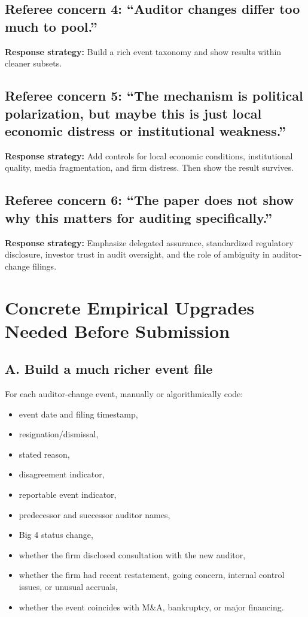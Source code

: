 \documentclass[12pt]{article}
\begin{document}
\subsection*{Referee concern 4: ``Auditor changes differ too much to pool.''}
\textbf{Response strategy:} Build a rich event taxonomy and show results within cleaner subsets.

\subsection*{Referee concern 5: ``The mechanism is political polarization, but maybe this is just local economic distress or institutional weakness.''}
\textbf{Response strategy:} Add controls for local economic conditions, institutional quality, media fragmentation, and firm distress. Then show the result survives.

\subsection*{Referee concern 6: ``The paper does not show why this matters for auditing specifically.''}
\textbf{Response strategy:} Emphasize delegated assurance, standardized regulatory disclosure, investor trust in audit oversight, and the role of ambiguity in auditor-change filings.

\section{Concrete Empirical Upgrades Needed Before Submission}

\subsection{A. Build a much richer event file}
For each auditor-change event, manually or algorithmically code:
\begin{itemize}[leftmargin=2em]
    \item event date and filing timestamp,
    \item resignation/dismissal,
    \item stated reason,
    \item disagreement indicator,
    \item reportable event indicator,
    \item predecessor and successor auditor names,
    \item Big 4 status change,
    \item whether the firm disclosed consultation with the new auditor,
    \item whether the firm had recent restatement, going concern, internal control issues, or unusual accruals,
    \item whether the event coincides with M\&A, bankruptcy, or major financing.
\end{itemize}
\end{document}
